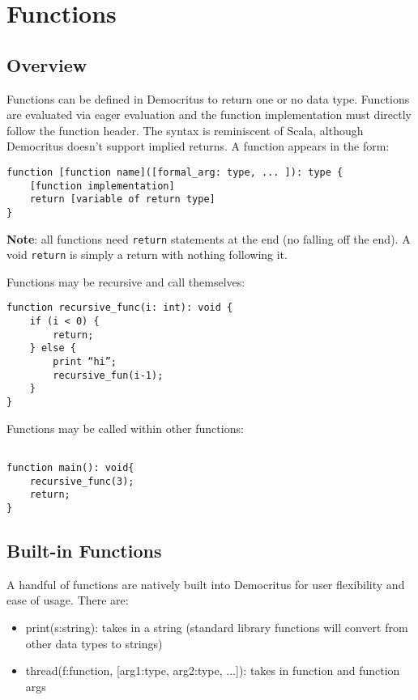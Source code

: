 \chapter{Functions}
    \section{Overview}
        Functions can be defined in Democritus to return one or no data type.  Functions are evaluated via eager evaluation and the function implementation must directly follow the function header. The syntax is reminiscent of Scala, although Democritus doesn't support implied returns.
        \vspace{5mm}
        \noindent A function appears in the form:
        
        \begin{lstlisting}
function [function name]([formal_arg: type, ... ]): type {
    [function implementation]
    return [variable of return type]
}
        \end{lstlisting}

        \noindent \textbf{Note}: all functions need \texttt{return} statements at the end (no falling off the end). A void \texttt{return} is simply a return with nothing following it.

        \vspace{5mm}
        \noindent Functions may be recursive and call themselves:

        \begin{lstlisting}
function recursive_func(i: int): void {
    if (i < 0) {
        return;
    } else {
        print “hi”;
        recursive_fun(i-1);
    }
}
        \end{lstlisting}


        \noindent Functions may be called within other functions:
        \begin{lstlisting}

function main(): void{
    recursive_func(3);
    return;
}
        \end{lstlisting}


    \section{Built-in Functions}
        A handful of functions are natively built into Democritus for user flexibility and ease of usage. There are:
        \begin{itemize}
            \item print(s:string): takes in a string (standard library functions will convert from other data types to strings)
            \item thread(f:function, [arg1:type, arg2:type, ...]): takes in function and function args
        \end{itemize}